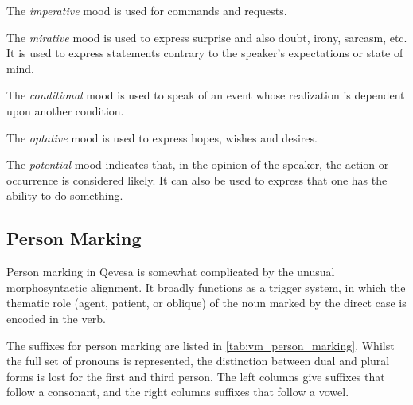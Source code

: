 \documentclass[grammar]{subfiles}
\begin{document}
  The \emph{imperative} mood is used for commands and requests. 

  The \emph{mirative} mood is used to express surprise and also doubt, irony,
  sarcasm, etc.  It is used to express statements contrary to the speaker’s
  expectations or state of mind.

  The \emph{conditional} mood is used to speak of an event whose realization is dependent upon another condition. 

  The \emph{optative} mood is used to express hopes, wishes and desires.

  The \emph{potential} mood indicates that, in the opinion of the speaker, the
  action or occurrence is considered likely.  It can also be used to express
  that one has the ability to do something.
  
  \subsection{Person Marking}
  \label{ssec:vm_person_marking}
  
  Person marking in Qevesa is somewhat complicated by the unusual
  morphosyntactic alignment.  It broadly functions as a trigger system, in
  which the thematic role (agent, patient, or oblique) of the noun marked by
  the direct case is encoded in the verb.  
  

  The suffixes for person marking are listed in \cref{tab:vm_person_marking}.
  Whilst the full set of pronouns is represented, the distinction between dual
  and plural forms is lost for the first and third person.  The left columns
  give suffixes that follow a consonant, and the right columns suffixes that follow
  a vowel. 
\end{document}
